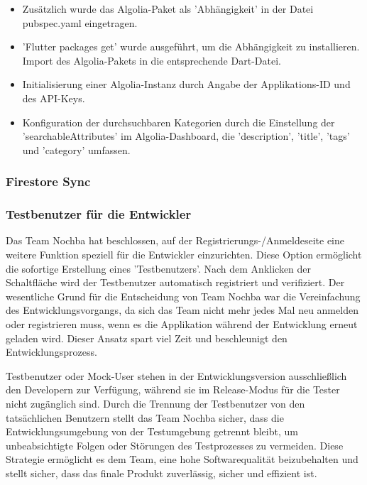 \begin{itemize}
  \item {Zusätzlich wurde das Algolia-Paket als 'Abhängigkeit' in der Datei pubspec.yaml eingetragen.}
  \item {'Flutter packages get' wurde ausgeführt, um die Abhängigkeit zu installieren.
        Import des Algolia-Pakets in die entsprechende Dart-Datei.}
  \item {Initialisierung einer Algolia-Instanz durch Angabe der Applikations-ID und des API-Keys.}
  \item {Konfiguration der durchsuchbaren Kategorien durch die Einstellung der 'searchableAttributes' im Algolia-Dashboard, die 'description', 'title', 'tags' und 'category' umfassen.}
\end{itemize}

\subsubsection{Firestore Sync}

\subsubsection{Testbenutzer für die Entwickler}

Das Team Nochba hat beschlossen, auf der Registrierungs-/Anmeldeseite eine weitere Funktion speziell für die Entwickler einzurichten. Diese Option ermöglicht die sofortige Erstellung eines 'Testbenutzers'. Nach dem Anklicken der Schaltfläche wird der Testbenutzer automatisch registriert und verifiziert. Der wesentliche Grund für die Entscheidung von Team Nochba war die Vereinfachung des Entwicklungsvorgangs, da sich das Team nicht mehr jedes Mal neu anmelden oder registrieren muss, wenn es die Applikation während der Entwicklung erneut geladen wird. Dieser Ansatz spart viel Zeit und beschleunigt den Entwicklungsprozess.

Testbenutzer oder Mock-User stehen in der Entwicklungsversion ausschließlich den Developern zur Verfügung, während sie im Release-Modus für die Tester nicht zugänglich sind. Durch die Trennung der Testbenutzer von den tatsächlichen Benutzern stellt das Team Nochba sicher, dass die Entwicklungsumgebung von der Testumgebung getrennt bleibt, um unbeabsichtigte Folgen oder Störungen des Testprozesses zu vermeiden. Diese Strategie ermöglicht es dem Team, eine hohe Softwarequalität beizubehalten und stellt sicher, dass das finale Produkt zuverlässig, sicher und effizient ist.

